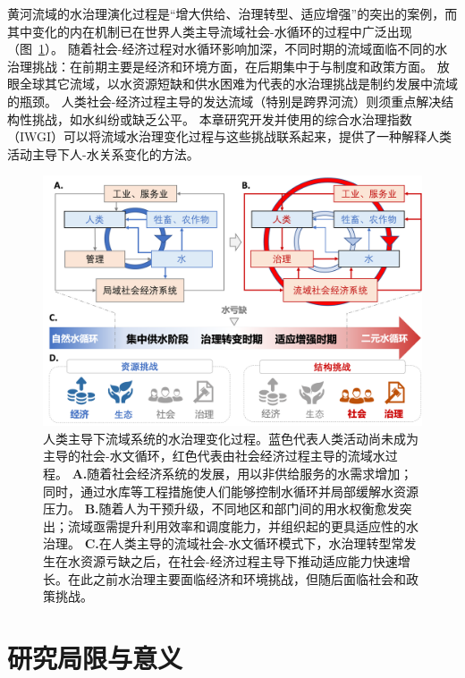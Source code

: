 黄河流域的水治理演化过程是“增大供给、治理转型、适应增强”的突出的案例，而其中变化的内在机制已在世界人类主导流域社会-水循环的过程中广泛出现（图~\ref{fig:summary}）。
随着社会-经济过程对水循环影响加深，不同时期的流域面临不同的水治理挑战：在前期主要是经济和环境方面，在后期集中于与制度和政策方面。
放眼全球其它流域，以水资源短缺和供水困难为代表的水治理挑战是制约发展中流域的瓶颈\cite{allan2019,speed2013,liu2012a}。
人类社会-经济过程主导的发达流域（特别是跨界河流）则须重点解决结构性挑战，如水纠纷或缺乏公平\cite{mirumachi2015}。
本章研究开发并使用的综合水治理指数（IWGI）可以将流域水治理变化过程与这些挑战联系起来，提供了一种解释人类活动主导下人-水关系变化的方法。

\begin{figure}[htbp!]
	\includegraphics[width=\textwidth]{img/ch4/ch4_transition.png}
	\caption[人类主导下流域系统的水治理阶段过渡]{
		人类主导下流域系统的水治理变化过程。蓝色代表人类活动尚未成为主导的社会-水文循环，红色代表由社会经济过程主导的流域水过程。
        \textbf{A.}随着社会经济系统的发展，用以非供给服务的水需求增加；同时，通过水库等工程措施使人们能够控制水循环并局部缓解水资源压力。
        \textbf{B.}随着人为干预升级，不同地区和部门间的用水权衡愈发突出；流域亟需提升利用效率和调度能力，并组织起的更具适应性的水治理。
        \textbf{C.}在人类主导的流域社会-水文循环模式下，水治理转型常发生在水资源亏缺之后，在社会-经济过程主导下推动适应能力快速增长。在此之前水治理主要面临经济和环境挑战，但随后面临社会和政策挑战。
	}\label{fig:summary}
\end{figure}

\section{研究局限与意义}

